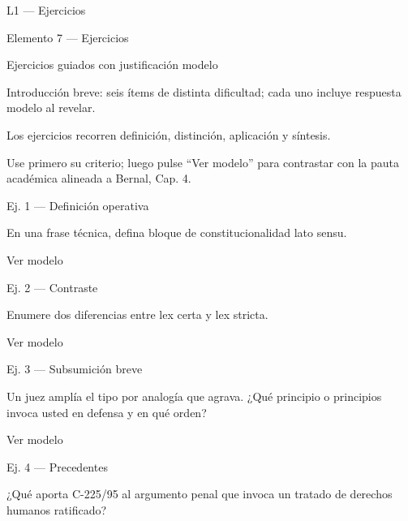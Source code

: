 \documentclass[11pt,a4paper]{article}
\begin{document}
L1 — Ejercicios\par





    Elemento 7 — Ejercicios\par
    Ejercicios guiados con justificación modelo\par

    Introducción breve: seis ítems de distinta dificultad; cada uno incluye respuesta modelo al revelar.\par


      Los ejercicios recorren definición, distinción, aplicación y síntesis.\par
      Use primero su criterio; luego pulse “Ver modelo” para contrastar con la pauta académica alineada a Bernal, Cap. 4.\par



      Ej. 1 — Definición operativa\par

      En una frase técnica, defina bloque de constitucionalidad lato sensu.\par

      Ver modelo\par





      Ej. 2 — Contraste\par

      Enumere dos diferencias entre lex certa y lex stricta.\par

      Ver modelo\par





      Ej. 3 — Subsumición breve\par

      Un juez amplía el tipo por analogía que agrava. ¿Qué principio o principios invoca usted en defensa y en qué orden?\par

      Ver modelo\par





      Ej. 4 — Precedentes\par

      ¿Qué aporta C-225/95 al argumento penal que invoca un tratado de derechos humanos ratificado?\par
\end{document}
